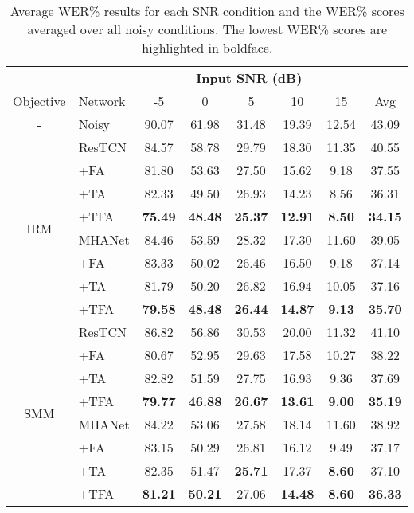 \begin{table}[!hbtp]
    \centering
    \scriptsize
    \def\arraystretch{0.965}
    \setlength{\tabcolsep}{4pt}
    \caption{Average WER\% results for each SNR condition and the WER\% scores averaged over all noisy conditions. The lowest WER\% scores are highlighted in boldface.}
    \begin{tabular}{@{}cl||cccccc@{}}
        \hline
        &  & \multicolumn{5}{c}{\textbf{Input SNR (dB)}} & \\  
        \cline{3-7}
        Objective & Network & -5 & 0 & 5 & 10 & 15 & Avg \\
        \hline
        - & Noisy & 90.07 & 61.98 & 31.48 & 19.39 & 12.54 & 43.09 \\
        \hline
        \hline
        \multirow{8}{*}{IRM}
        & ResTCN & 84.57 & 58.78 & 29.79 & 18.30 & 11.35 & 40.55 \\
        & +FA & 81.80 & 53.63 & 27.50 & 15.62 & 9.18 & 37.55 \\
        & +TA & 82.33 & 49.50 & 26.93 & 14.23 & 8.56 & 36.31\\
        & +TFA & \textbf{75.49} & \textbf{48.48} & \textbf{25.37} & \textbf{12.91} & \textbf{8.50}& \textbf{34.15}\\
        \cline{2-8}
        & MHANet & 84.46 & 53.59 & 28.32 & 17.30 & 11.60 & 39.05\\
        & +FA & 83.33 & 50.02 & 26.46 & 16.50 & 9.18 & 37.14\\
        & +TA & 81.79 & 50.20 & 26.82 & 16.94 & 10.05 & 37.16\\
        & +TFA & \textbf{79.58} & \textbf{48.48} & \textbf{26.44} & \textbf{14.87} & \textbf{9.13 }& \textbf{35.70}\\
        \hline
        \hline
        
        \multirow{8}{*}{SMM}
        & ResTCN & 86.82 & 56.86 & 30.53 & 20.00 & 11.32 & 41.10 \\
        & +FA & 80.67 & 52.95 & 29.63 & 17.58 & 10.27 & 38.22 \\
        & +TA & 82.82 & 51.59 & 27.75 & 16.93 & 9.36 & 37.69 \\
        & +TFA & \textbf{79.77} & \textbf{46.88} & \textbf{26.67} & \textbf{13.61} & \textbf{9.00 }& \textbf{35.19}\\
        \cline{2-8}
        & MHANet & 84.22 & 53.06 & 27.58 & 18.14 & 11.60 & 38.92\\
        & +FA & 83.15 & 50.29 & 26.81 & 16.12 & 9.49 & 37.17\\
        & +TA & 82.35 & 51.47 & \textbf{25.71} & 17.37 & \textbf{8.60 }& 37.10\\
        & +TFA & \textbf{81.21} & \textbf{50.21} & 27.06 & \textbf{14.48} & \textbf{8.60 }& \textbf{36.33} \\
        \hline
        \hline
        

\end{tabular}
\end{table}
